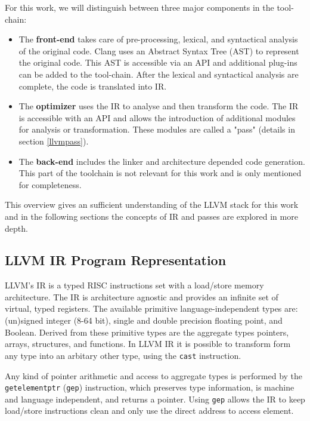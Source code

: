 For this work, we will distinguish between three major components in the tool-chain:
\begin{itemize}
	\item The \textbf{front-end} takes care of pre-processing, lexical, and syntactical analysis of the original code. Clang uses an Abstract Syntax Tree (AST) to represent the original code. This AST is accessible via an API and additional plug-ins can be added to the tool-chain. After the lexical and syntactical analysis are complete, the code is translated into IR. 
	\item The \textbf{optimizer} uses the IR to analyse and then transform the code. The IR is accessible with an API and allows the introduction of additional modules for analysis or transformation. These modules are called a "pass" (details in section \ref{llvmpass}).
	\item The \textbf{back-end} includes the linker and architecture depended code generation. This part of the
	toolchain is not relevant for this work and is only mentioned for completeness.
\end{itemize}
This overview gives an sufficient understanding of the LLVM stack for this work and in the following sections
the concepts of IR and passes are explored in more depth.

\subsection{LLVM IR Program Representation} \label{llvmir}
LLVM's IR is a typed RISC instructions set with a load/store memory architecture. The IR is architecture agnostic and provides an infinite set of virtual, typed registers. The available primitive language-independent types are: (un)signed integer (8-64 bit), single and double precision floating point, and Boolean. Derived from these primitive types are the aggregate types pointers, arrays, structures, and functions. In LLVM IR it is possible to transform form any type into an arbitary other type, using the \verb|cast| instruction. \cite{Lattner:2004:LCF:977395.977673}

Any kind of pointer arithmetic and access to aggregate types is performed by the \verb|getelementptr| (\verb|gep|) instruction, which preserves type information, is machine and language independent, and returns a pointer. Using \verb|gep| allows the IR to keep load/store instructions clean and only use the direct address to access element.
\cite{Lattner:2004:LCF:977395.977673}

